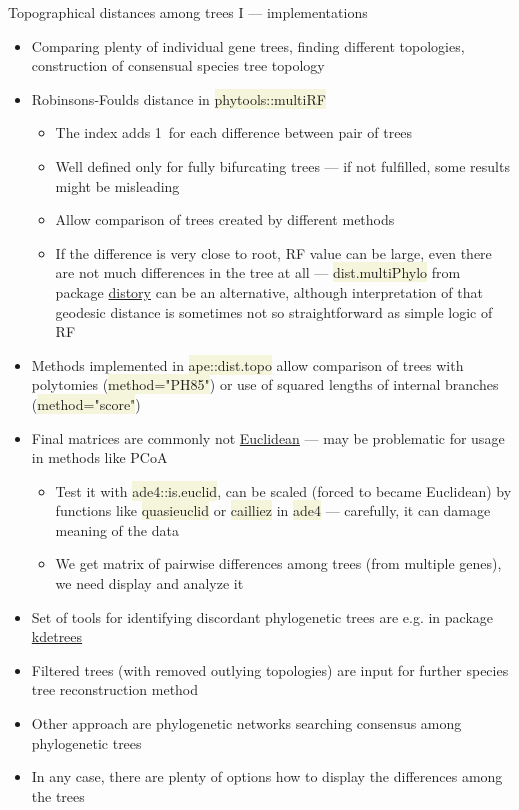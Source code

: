 \documentclass[compress, xelatex, 11pt, xcolor=svgnames, aspectratio=169, url={hyphens, lowtilde}]{beamer}
\renewcommand{\texttt}[1]{\colorbox{Beige}{{\ttfamily #1}}}
\begin{document}
\begin{frame}[allowframebreaks]{Topographical distances among trees I --- implementations}
	\begin{itemize}
		\item Comparing plenty of individual gene trees, finding different topologies, construction of consensual species tree topology
		\item Robinsons-Foulds distance in \texttt{phytools::multiRF}
		\begin{itemize}
			\item The index adds 1~for each difference between pair of trees
			\item Well defined only for fully bifurcating trees --- if not fulfilled, some results might be misleading
			\item Allow comparison of trees created by different methods
			\item If the difference is very close to root, RF value can be large, even there are not much differences in the tree at all --- \texttt{dist.multiPhylo} from package \href{https://CRAN.R-project.org/package=distory}{distory} can be an alternative, although interpretation of that geodesic distance is sometimes not so straightforward as simple logic of RF
		\end{itemize}
		\item Methods implemented in \texttt{ape::dist.topo} allow comparison of trees with polytomies (\texttt{method="PH85"}) or use of squared lengths of internal branches (\texttt{method="score"})
		\item Final matrices are commonly not \href{https://en.wikipedia.org/wiki/Euclidean_distance_matrix}{Euclidean} --- may be problematic for usage in methods like PCoA
		\begin{itemize}
			\item Test it with \texttt{ade4::is.euclid}, can be scaled (forced to became Euclidean) by functions like \texttt{quasieuclid} or \texttt{cailliez} in \texttt{ade4} --- carefully, it can damage meaning of the data
			\item We get matrix of pairwise differences among trees (from multiple genes), we need display and analyze it
		\end{itemize}
		\item Set of tools for identifying discordant phylogenetic trees are e.g. in package \href{https://github.com/V-Z/kdetrees}{kdetrees}
		\item Filtered trees (with removed outlying topologies) are input for further species tree reconstruction method
		\item Other approach are phylogenetic networks searching consensus among phylogenetic trees
		\item In any case, there are plenty of options how to display the differences among the trees
	\end{itemize}
\end{frame}
\end{document}

